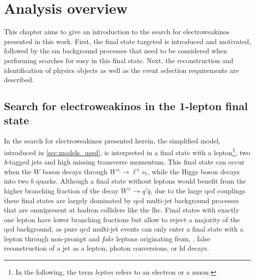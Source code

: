 
\chapter{Analysis overview}\label{ch:1lepton}


\graphicspath{{chapter-analysis/Figs/Vector/}{chapter-analysis/Figs/}}


This chapter aims to give an introduction to the search for electroweakinos presented in this work. First, the final state targeted is introduced and motivated, followed by the \gls{sm} background processes that need to be considered when performing searches for \gls{susy} in this final state. Next, the reconstruction and identification of physics objects as well as the event selection requirements are described.

\section{Search for electroweakinos in the 1-lepton final state}

In the search for electroweakinos presented herein, the simplified model, introduced in \cref{sec:models_used}, is interpreted in a final state with a lepton\footnote{In the following, the term \textit{lepton} refers to an electron or a muon.}, two \textit{b}-tagged jets and high missing transverse momentum.
This final state can occur when the $W$ boson decays through $W^\pm\rightarrow\ell^\pm\nu_\ell$, while the Higgs boson decays into two $b$ quarks.
Although a final state without leptons would benefit from the higher branching fraction of the decay $W^\pm\rightarrow q'\bar{q}$, due to the large \gls{qcd} couplings these final states are largely dominated by \gls{qcd} multi-jet background processes that are omnipresent at hadron colliders like the \gls{lhc}.
Final states with exactly one lepton have lower branching fractions but allow to reject a majority of the \gls{qcd} background, as pure \gls{qcd} multi-jet events can only enter a final state with a lepton through non-prompt and \textit{fake} leptons originating from, \eg, false reconstruction of a jet as a lepton, photon conversions, or \gls{hf} decays. 

